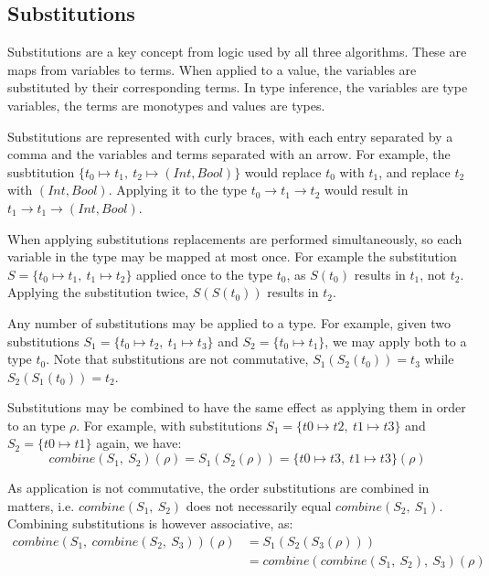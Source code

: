 \documentclass[a4paper,fleqn,oneside,12pt]{report}
\begin{document}
\subsection{Substitutions}

Substitutions are a key concept from logic used by all three algorithms. These are maps from variables to terms. When applied to a value, the variables are substituted by their corresponding terms. In type inference, the variables are type variables, the terms are monotypes and values are types.

Substitutions are represented with curly braces, with each entry separated by a comma and the variables and terms separated with an arrow. For example, the susbtitution $\{ t_0 \mapsto t_1,\ t_2 \mapsto (Int, Bool) \}$ would replace $t_0$ with $t_1$, and replace $t_2$ with $(Int, Bool)$. Applying it to the type $t_0 \rightarrow t_1 \rightarrow t_2$ would result in $t_1 \rightarrow t_1 \rightarrow (Int, Bool)$.

When applying substitutions replacements are performed simultaneously, so each variable in the type may be mapped at most once. For example the substitution $S = \{ t_0 \mapsto t_1,\ t_1 \mapsto t_2 \}$ applied once to the type $t_0$, as $S(t_0)$ results in $t_1$, not $t_2$. Applying the substitution twice, $S(S(t_0))$ results in $t_2$.

Any number of substitutions may be applied to a type. For example, given two substitutions $S_1 = \{ t_0 \mapsto t_2,\ t_1 \mapsto t_3 \}$ and $S_2 = \{ t_0 \mapsto t_1 \}$, we may apply both to a type $t_0$. Note that substitutions are not commutative, $S_1(S_2(t_0)) = t_3$ while $S_2(S_1(t_0)) = t_2$.

Substitutions may be combined to have the same effect as applying them in order to an type $\rho$. For example, with substitutions $S_1 = \{ t0 \mapsto t2,\ t1 \mapsto t3 \}$ and $S_2 = \{ t0 \mapsto t1 \}$ again, we have:
$$\mathit{combine}(S_1,\ S_2)(\rho) = S_1(S_2(\rho)) = \{ t0 \mapsto t3,\ t1 \mapsto t3 \}(\rho)$$

As application is not commutative, the order substitutions are combined in matters, i.e. $\mathit{combine}(S_1,\ S_2)$ does not necessarily equal $\mathit{combine}(S_2,\ S_1)$. Combining substitutions is however associative, as:
\begin{align*}
  \mathit{combine}(S_1,\ \mathit{combine}(S_2,\ S_3))(\rho) & = S_1(S_2(S_3(\rho)))\\& = \mathit{combine}(\mathit{combine}(S_1,\ S_2),\ S_3)(\rho)
\end{align*}
\end{document}
